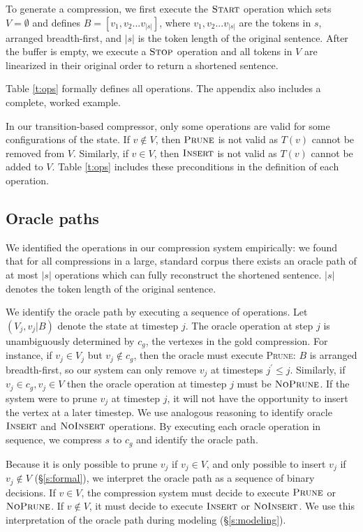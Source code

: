 \documentclass[11pt,a4paper]{article}
\begin{document}
To generate a compression, we first execute the $\textsc{Start}$ operation which sets $V=\emptyset$ and defines $B=[v_1, v_2 ... v_{|s|}]$, where $v_1, v_2 ... v_{|s|}$ are the tokens in $s$, arranged breadth-first, and $|s|$ is the token length of the original sentence. After the buffer is empty, we execute a $\textsc{Stop}$ operation and all tokens in $V$ are linearized in their original order to return a shortened sentence. 

Table \ref{t:ops} formally defines all operations. The appendix also includes a complete, worked example. 

In our transition-based compressor, only some operations are valid for some configurations of the state. If $v \notin V$, then $\textsc{Prune}$ is not valid as $T(v)$ cannot be removed from $V$. Similarly, if $v \in V$, then $\textsc{Insert}$ is not valid as $T(v)$ cannot be added to $V$. Table \ref{t:ops} includes these preconditions in the definition of each operation.

\subsection{Oracle paths}\label{s:oracle}

We identified the operations in our compression system empirically: we found that for all compressions in a large, standard corpus \cite{filippova2013overcoming} there exists an oracle path of at most $|s|$ operations which can fully reconstruct the shortened sentence. $|s|$ denotes the token length of the original sentence.

We identify the oracle path by executing  a sequence of operations. Let $(V_j, v_j | B)$ denote the state at timestep $j$. The oracle operation at step $j$ is unambiguously determined by $c_g$, the vertexes in the gold compression. For instance, if $v_j \in V_j$ but $v_j \notin c_g$, then the oracle must execute \textsc{Prune}: $B$ is arranged breadth-first, so our system can only remove $v_j$ at timesteps $j^{\prime} \leq j$. Similarly, if $v_j \in c_g, v_j \in V$ then the oracle operation at timestep $j$ must be $\textsc{NoPrune}$. If the system were to prune $v_j$ at timestep $j$, it will not have the opportunity to insert the vertex at a later timestep. We use analogous reasoning to identify oracle $\textsc{Insert}$ and $\textsc{NoInsert}$ operations. By executing each oracle operation in sequence, we compress $s$ to $c_g$ and identify the oracle path.

Because it is only possible to prune $v_j$ if $v_j \in V$, and only possible to insert $v_j$ if $v_j \notin V$ (\S\ref{s:formal}), we interpret the oracle path as a sequence of binary decisions. If $v \in V$, the compression system must decide to execute $\textsc{Prune}$ or $\textsc{NoPrune}$. If $v \notin V$, it must decide to execute $\textsc{Insert}$ or $\textsc{NoInsert}$. We use this interpretation of the oracle path during modeling (\S\ref{s:modeling}).
\end{document}

